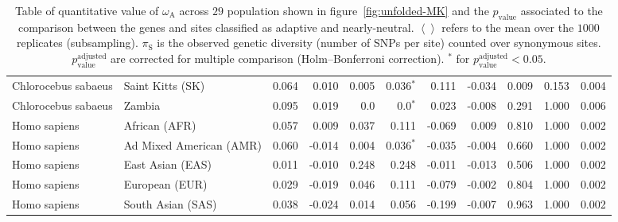 \documentclass{article}
\begin{document}
\begin{table*}[!ht]
\begin{adjustbox}{width = 1\textwidth}
\begin{tabular}{|l|l|r|r|r|r|r|r|r|r|r|}
			\rowcolor{LIGHTGREY} Chlorocebus sabaeus & Saint Kitts (SK) & 0.064 & 0.010 & 0.005 & 0.036$\bm{^*}$ & 0.111 & -0.034 & 0.009 & 0.153\hspace{5pt} & 0.004 \\
			\rowcolor{LIGHTGREY} Chlorocebus sabaeus & Zambia & 0.095 & 0.019 & 0.0 & 0.0$\bm{^*}$ & 0.023 & -0.008 & 0.291 & 1.000\hspace{5pt} & 0.006 \\ \hline
			Homo sapiens & African (AFR) & 0.057 & 0.009 & 0.037 & 0.111\hspace{5pt} & -0.069 & 0.009 & 0.810 & 1.000\hspace{5pt} & 0.002 \\
			Homo sapiens & Ad Mixed American (AMR) & 0.060 & -0.014 & 0.004 & 0.036$\bm{^*}$ & -0.035 & -0.004 & 0.660 & 1.000\hspace{5pt} & 0.002 \\
			Homo sapiens & East Asian (EAS) & 0.011 & -0.010 & 0.248 & 0.248\hspace{5pt} & -0.011 & -0.013 & 0.506 & 1.000\hspace{5pt} & 0.002 \\
			Homo sapiens & European (EUR) & 0.029 & -0.019 & 0.046 & 0.111\hspace{5pt} & -0.079 & -0.002 & 0.804 & 1.000\hspace{5pt} & 0.002 \\
			Homo sapiens & South Asian (SAS) & 0.038 & -0.024 & 0.014 & 0.056\hspace{5pt} & -0.199 & -0.007 & 0.963 & 1.000\hspace{5pt} & 0.002 \\
			\bottomrule
		\end{tabular}
	\end{adjustbox}
	\caption{
		Table of quantitative value of $\omega_{\mathrm{A}}$ across $29$ population shown in figure~\ref{fig:unfolded-MK} and the $p_{\mathrm{value}}$ associated to the comparison between the genes and sites classified as adaptive and nearly-neutral.
		$\left< \right>$ refers to the mean over the $1000$ replicates (subsampling).
		$\pi_{\textrm{S}}$ is the observed genetic diversity (number of SNPs per site) counted over synonymous sites.
		$p_{\mathrm{value}}^{\mathrm{adjusted}}$ are corrected for multiple comparison (Holm–Bonferroni correction).
		$^*$ for $p_{\mathrm{value}}^{\mathrm{adjusted}} < 0.05$.
	}
	\label{table:unfolded-MK}
\end{table*}
\end{document}
